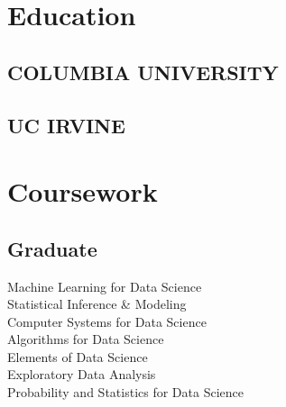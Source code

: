 \documentclass[]{deedy-resume-openfont}
\begin{document}
%
%


%
%

\begin{minipage}[t]{0.33\textwidth} 


\section{Education} 

\subsection{COLUMBIA UNIVERSITY}
\sectionsep

\subsection{UC IRVINE}
\sectionsep


\section{Coursework}
\subsection{Graduate} 
Machine Learning for Data Science \\
Statistical Inference \& Modeling \\
Computer Systems for Data Science \\
Algorithms for Data Science \\
Elements of Data Science \\
Exploratory Data Analysis \\
Probability and Statistics for Data Science \\

\end{minipage}
\end{document}
